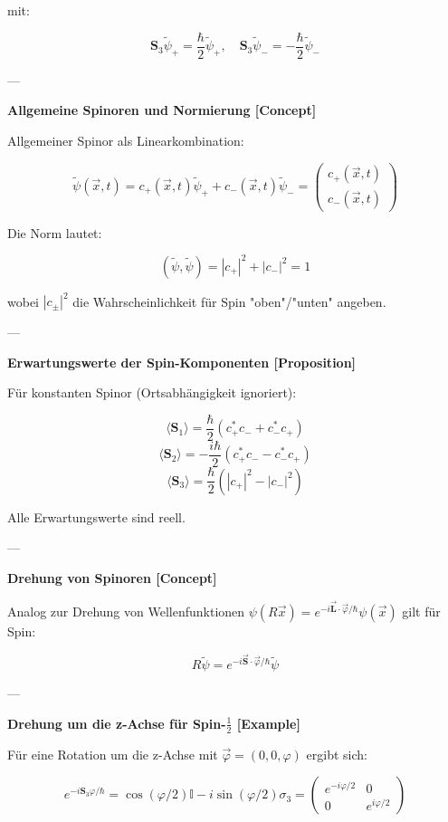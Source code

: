 \documentclass[10pt, letterpaper]{article}
\begin{document}
mit:

\[
\mathbf{S}_3 \tilde{\psi}_+ = \frac{\hbar}{2} \tilde{\psi}_+,\quad
\mathbf{S}_3 \tilde{\psi}_- = -\frac{\hbar}{2} \tilde{\psi}_-
\]

---

\textbf{Allgemeine Spinoren und Normierung [Concept]}

Allgemeiner Spinor als Linearkombination:

\[
\tilde{\psi}(\vec{x}, t) = c_+(\vec{x}, t)\tilde{\psi}_+ + c_-(\vec{x}, t)\tilde{\psi}_- = \begin{pmatrix}c_+(\vec{x}, t)\\ c_-(\vec{x}, t)\end{pmatrix}
\]

Die Norm lautet:

\[
(\tilde{\psi}, \tilde{\psi}) = |c_+|^2 + |c_-|^2 = 1
\]

wobei \( |c_\pm|^2 \) die Wahrscheinlichkeit für Spin "oben"/"unten" angeben.

---

\textbf{Erwartungswerte der Spin-Komponenten [Proposition]}

Für konstanten Spinor (Ortsabhängigkeit ignoriert):

\[
\langle \mathbf{S}_1 \rangle = \frac{\hbar}{2}(c_+^*c_- + c_-^*c_+)
\]
\[
\langle \mathbf{S}_2 \rangle = -\frac{i\hbar}{2}(c_+^*c_- - c_-^*c_+)
\]
\[
\langle \mathbf{S}_3 \rangle = \frac{\hbar}{2}(|c_+|^2 - |c_-|^2)
\]

Alle Erwartungswerte sind reell.

---

\textbf{Drehung von Spinoren [Concept]}

Analog zur Drehung von Wellenfunktionen \( \psi(R\vec{x}) = e^{-i\vec{\mathbf{L}}\cdot \vec{\varphi}/\hbar} \psi(\vec{x}) \) gilt für Spin:

\[
R \tilde{\psi} = e^{-i\vec{\mathbf{S}}\cdot \vec{\varphi}/\hbar} \tilde{\psi}
\]

---

\textbf{Drehung um die z-Achse für Spin-\(\frac{1}{2}\) [Example]}

Für eine Rotation um die z-Achse mit \( \vec{\varphi} = (0,0,\varphi) \) ergibt sich:

\[
e^{-i \mathbf{S}_3 \varphi / \hbar}
= \cos (\varphi / 2)\mathbb{I}
- i \sin (\varphi / 2)\sigma_3
= \begin{pmatrix}
e^{-i\varphi/2} & 0 \\
0 & e^{i\varphi/2}
\end{pmatrix}
\]
\end{document}
